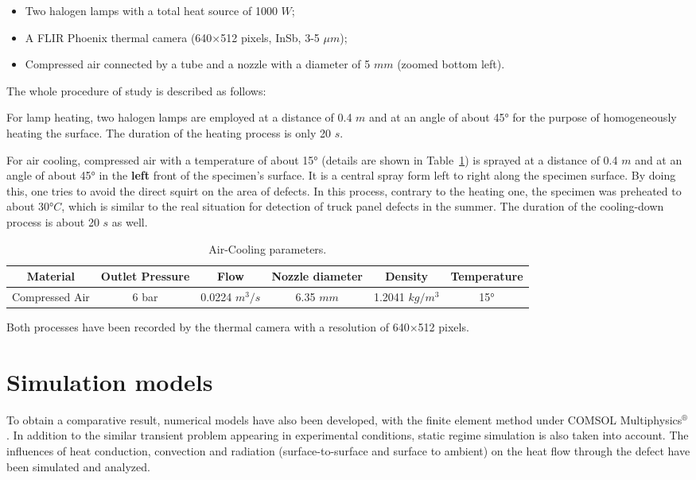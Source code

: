 \begin{itemize}
  \item Two halogen lamps with a total heat source of 1000 $W$;
  \item A FLIR Phoenix thermal camera (640×512 pixels, InSb, 3-5 $\mu m$);
  \item Compressed air connected by a tube and a nozzle with a diameter of 5 $mm$ (zoomed bottom left).
\end{itemize}

The whole procedure of study is described as follows:  

For lamp heating, two halogen lamps are employed at a distance of 0.4 $ m $ and at an angle of about 45° for the purpose of homogeneously heating the surface. The duration of the heating process is only 20 $ s $.   

For air cooling, compressed air with a temperature of about 15° (details are shown in Table~\ref{air_cool}) is sprayed at a distance of 0.4 $m$ and at an angle of about 45° in the \textbf{left} front of the specimen’s surface. It is a central spray form left to right along the specimen surface. By doing this, one tries to avoid the direct squirt on the area of defects. In this process, contrary to the heating one, the specimen was preheated to about 30$ °C $, which is similar to the real situation for detection of truck panel defects in the summer. The duration of the cooling-down process is about 20 $ s $ as well.   
 \begin{table}
 \caption{Air-Cooling parameters.}
 \centering
 \scriptsize
 {\begin{tabular}[l]{@{}cccccc}\toprule
   Material & Outlet Pressure & Flow
          & Nozzle diameter
          & Density & Temperature \\
 \midrule
   Compressed Air & 6 bar & 0.0224 $m^3/s$ & 6.35 $mm$ & 1.2041 $kg/m^3$ & 15° \\
 \bottomrule
 \end{tabular}}
 \label{air_cool}
 \end{table}
Both processes have been recorded by the thermal camera with a resolution of 640$\times$512 pixels.  

\section{Simulation models}
To obtain a comparative result, numerical models have also been developed, with the finite element method under COMSOL Multiphysics$^{®}$. In addition to the similar transient problem appearing in experimental conditions, static regime simulation is also taken into account. The influences of heat conduction, convection and radiation (surface-to-surface and surface to ambient) on the heat flow through the defect have been simulated and analyzed.

